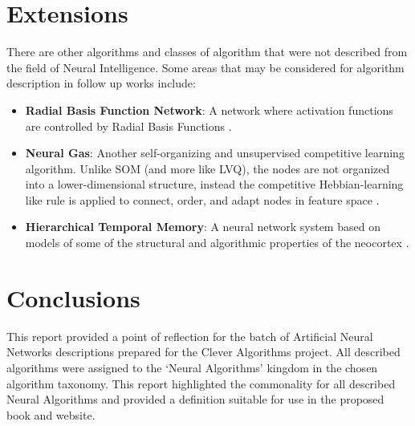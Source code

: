 \documentclass[a4paper, 11pt]{article}
\begin{document}
% 
% 
\section{Extensions}
\label{sec:extensions}
There are other algorithms and classes of algorithm that were not described from the field of Neural Intelligence. Some areas that may be considered for algorithm description in follow up works include:

\begin{itemize}
	\item \textbf{Radial Basis Function Network}: A network where activation functions are controlled by Radial Basis Functions \cite{Howlett2001}.
	\item \textbf{Neural Gas}: Another self-organizing and unsupervised competitive learning algorithm. Unlike SOM (and more like LVQ), the nodes are not organized into a lower-dimensional structure, instead the competitive Hebbian-learning like rule is applied to connect, order, and adapt nodes in feature space \cite{Martinetz1991, Martinetz1993, Martinetz1994}.
	\item \textbf{Hierarchical Temporal Memory}: A neural network system based on models of some of the structural and algorithmic properties of the neocortex \cite{Hawkins2005}.
\end{itemize}

% 
% 
\section{Conclusions}
\label{sec:conclusions}
This report provided a point of reflection for the batch of Artificial Neural Networks descriptions prepared for the Clever Algorithms project. All described algorithms were assigned to the `Neural Algorithms' kingdom in the chosen algorithm taxonomy. This report highlighted the commonality for all described Neural Algorithms and provided a definition suitable for use in the proposed book and website.



\end{document}
